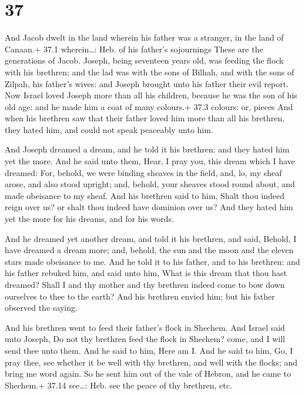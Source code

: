 \hypertarget{section-36}{%
\section{37}\label{section-36}}

 And Jacob dwelt in the land wherein his father was a
stranger, in the land of Canaan.+ 37.1 wherein\ldots: Heb. of his
father's sojournings  These are the generations of Jacob.
Joseph, being seventeen years old, was feeding the flock with his
brethren; and the lad was with the sons of Bilhah, and with the sons of
Zilpah, his father's wives: and Joseph brought unto his father their
evil report.  Now Israel loved Joseph more than all his
children, because he was the son of his old age: and he made him a coat
of many colours.+ 37.3 colours: or, pieces  And when his
brethren saw that their father loved him more than all his brethren,
they hated him, and could not speak peaceably unto him.

 And Joseph dreamed a dream, and he told it his brethren:
and they hated him yet the more.  And he said unto them,
Hear, I pray you, this dream which I have dreamed:  For,
behold, we were binding sheaves in the field, and, lo, my sheaf arose,
and also stood upright; and, behold, your sheaves stood round about, and
made obeisance to my sheaf.  And his brethren said to him,
Shalt thou indeed reign over us? or shalt thou indeed have dominion over
us? And they hated him yet the more for his dreams, and for his words.

 And he dreamed yet another dream, and told it his
brethren, and said, Behold, I have dreamed a dream more; and, behold,
the sun and the moon and the eleven stars made obeisance to me.
 And he told it to his father, and to his brethren: and his
father rebuked him, and said unto him, What is this dream that thou hast
dreamed? Shall I and thy mother and thy brethren indeed come to bow down
ourselves to thee to the earth?  And his brethren envied
him; but his father observed the saying.

 And his brethren went to feed their father's flock in
Shechem.  And Israel said unto Joseph, Do not thy brethren
feed the flock in Shechem? come, and I will send thee unto them. And he
said to him, Here am I.  And he said to him, Go, I pray
thee, see whether it be well with thy brethren, and well with the
flocks; and bring me word again. So he sent him out of the vale of
Hebron, and he came to Shechem.+ 37.14 see\ldots: Heb. see the peace of
thy brethren, etc.

